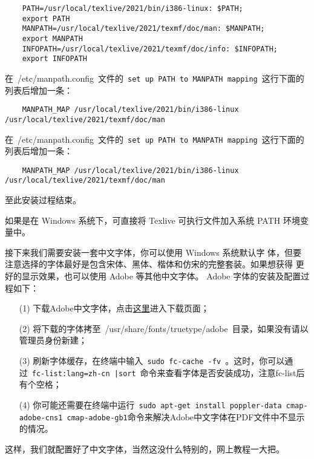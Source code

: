 \begin{lstlisting}
    PATH=/usr/local/texlive/2021/bin/i386-linux: $PATH;
    export PATH
    MANPATH=/usr/local/texlive/2021/texmf/doc/man: $MANPATH;
    export MANPATH
    INFOPATH=/usr/local/texlive/2021/texmf/doc/info: $INFOPATH;
    export INFOPATH
  \end{lstlisting}

在~{/etc/manpath.config}~文件的~\texttt{set up PATH to  MANPATH mapping}~这行下面的列表后增加一条：

\begin{lstlisting}
    MANPATH_MAP /usr/local/texlive/2021/bin/i386-linux  /usr/local/texlive/2021/texmf/doc/man
  \end{lstlisting}

在~{/etc/manpath.config}~文件的~\texttt{set up PATH to  MANPATH mapping}~这行下面的列表后增加一条：

\begin{lstlisting}
    MANPATH_MAP /usr/local/texlive/2021/bin/i386-linux /usr/local/texlive/2021/texmf/doc/man
  \end{lstlisting}

至此安装过程结束。


如果是在 Windows 系统下，可直接将 Texlive 可执行文件加入系统 PATH 环境变量中。

接下来我们需要安装一套中文字体，你可以使用 Windows 系统默认字
体，但要注意选择的字体最好是包含宋体、黑体、楷体和仿宋的完整套装。如果想获得
更好的显示效果，也可以使用 Adobe 等其他中文字体。 Adobe 字体的安装及配置过程如下：

\begin{enumerate}
  \item[(1)] 下载Adobe中文字体，点击\href{http://forum.ubuntu.org.cn/viewtopic.php?f=35&t=180987&start=0}{这里}进入下载页面；
  \item[(2)] 将下载的字体拷至~{/usr/share/fonts/truetype/adobe}~目录，如果没有请以管理员身份新建；
  \item[(3)] 刷新字体缓存，在终端中输入~\texttt{sudo fc-cache -fv }。这时，你可以通过~\texttt{fc-list:lang=zh-cn |sort}~命令来查看字体是否安装成功，注意fc-list后有个空格；
  \item[(4)] 你可能还需要在终端中运行~\texttt{sudo apt-get install poppler-data cmap-adobe-cns1 cmap-adobe-gb1}命令来解决Adobe中文字体在PDF文件中不显示的情况。
\end{enumerate}

这样，我们就配置好了中文字体，当然这没什么特别的，网上教程一大把。

